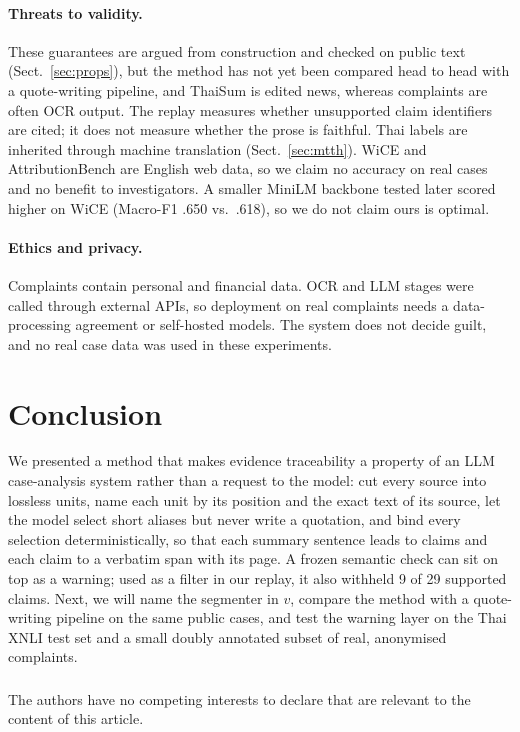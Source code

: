 \documentclass[runningheads]{llncs}
\begin{document}
\paragraph{Threats to validity.}
These guarantees are argued from construction and checked on public text (Sect.~\ref{sec:props}),
but the method has not yet been compared head to head with a quote-writing pipeline, and ThaiSum is
edited news, whereas complaints are often OCR output. The replay measures whether unsupported claim identifiers are cited; it does
not measure whether the prose is faithful. Thai labels are inherited through machine translation (Sect.~\ref{sec:mtth}). WiCE and AttributionBench are English web data, so
we claim no accuracy on real cases and no benefit to investigators. A smaller MiniLM backbone tested
later scored higher on WiCE (Macro-F1 .650 vs.\ .618), so we do not claim ours is optimal.

\paragraph{Ethics and privacy.}
Complaints contain personal and financial data. OCR and LLM stages were called through external
APIs, so deployment on real complaints needs a data-processing agreement or self-hosted models. The
system does not decide guilt, and no real case data was used in these experiments.

\section{Conclusion}

We presented a method that makes evidence traceability a property of an LLM case-analysis system
rather than a request to the model: cut every source into lossless units, name each unit by its position and the exact
text of its source, let the model select short aliases but never write a quotation, and bind every selection
deterministically, so that each summary sentence leads to claims and each claim to a verbatim span with
its page. A frozen semantic check can sit on top as a warning; used as a filter in our replay, it also
withheld 9 of 29 supported claims. Next, we will name the segmenter in $v$, compare the
method with a quote-writing pipeline on the same public cases, and test the warning layer on the Thai
XNLI test set \cite{conneau2018xnli} and a small doubly annotated subset of real, anonymised
complaints.

\begin{credits}
\subsubsection{\discintname}
The authors have no competing interests to declare that are relevant to the content of this article.
\end{credits}



\end{document}

